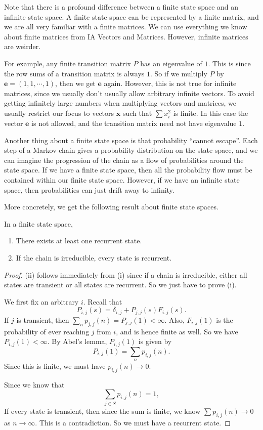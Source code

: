 \documentclass[a4paper]{article}
\begin{document}
Note that there is a profound difference between a finite state space and an infinite state space. A finite state space can be represented by a finite matrix, and we are all very familiar with a finite matrices. We can use everything we know about finite matrices from IA Vectors and Matrices. However, infinite matrices are weirder.

For example, any finite transition matrix $P$ has an eigenvalue of $1$. This is since the row sums of a transition matrix is always $1$. So if we multiply $P$ by $\mathbf{e} = (1, 1, \cdots, 1)$, then we get $\mathbf{e}$ again. However, this is not true for infinite matrices, since we usually don't usually allow arbitrary infinite vectors. To avoid getting infinitely large numbers when multiplying vectors and matrices, we usually restrict our focus to vectors $\mathbf{x}$ such that $\sum x_i^2$ is finite. In this case the vector $\mathbf{e}$ is not allowed, and the transition matrix need not have eigenvalue $1$.

Another thing about a finite state space is that probability ``cannot escape''. Each step of a Markov chain gives a probability distribution on the state space, and we can imagine the progression of the chain as a flow of probabilities around the state space. If we have a finite state space, then all the probability flow must be contained within our finite state space. However, if we have an infinite state space, then probabilities can just drift away to infinity.

More concretely, we get the following result about finite state spaces.
\begin{thm}
  In a finite state space,
  \begin{enumerate}
    \item There exists at least one recurrent state.
    \item If the chain is irreducible, every state is recurrent.
  \end{enumerate}
\end{thm}

\begin{proof}
  (ii) follows immediately from (i) since if a chain is irreducible, either all states are transient or all states are recurrent. So we just have to prove (i).

  We first fix an arbitrary $i$. Recall that
  \[
    P_{i, j}(s) = \delta_{i, j} + P_{j, j}(s) F_{i, j}(s).
  \]
  If $j$ is transient, then $\sum_n p_{j, j}(n) = P_{j, j}(1) < \infty$. Also, $F_{i, j}(1)$ is the probability of ever reaching $j$ from $i$, and is hence finite as well. So we have $P_{i, j}(1) < \infty$. By Abel's lemma, $P_{i, j}(1)$ is given by
  \[
    P_{i, j}(1) = \sum_n p_{i, j}(n).
  \]
  Since this is finite, we must have $p_{i, j}(n)\to 0$.

  Since we know that
  \[
    \sum_{j\in S}p_{i, j}(n) = 1,
  \]
  If every state is transient, then since the sum is finite, we know $\sum p_{i, j}(n) \to 0$ as $n\to \infty$. This is a contradiction. So we must have a recurrent state.
\end{proof}
\end{document}
